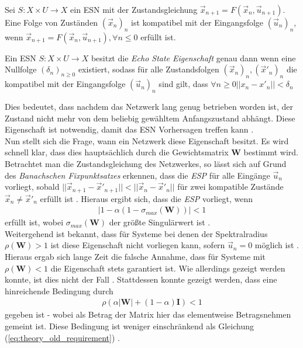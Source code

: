 \begin{definition}
Sei $S : X \times U \rightarrow X$ ein \textsc{ESN} mit der Zustandsgleichung $\vec{x}_{n+1} = F \left( \vec{x}_n, \vec{u}_{n+1} \right)$. Eine Folge von Zuständen $(\vec{x}_n)_n$ ist kompatibel mit der Eingangsfolge $(\vec{u}_n)_n$, wenn $\vec{x}_{n+1} = F\left( \vec{x}_n, \vec{u}_{n+1} \right), \forall n \leq 0$ erfüllt ist.
\end{definition}

\begin{definition}
Ein \textsc{ESN} $S : X \times U \rightarrow X$ besitzt die \textit{Echo State Eigenschaft} genau dann wenn eine Nullfolge $(\delta_n)_{n \geq 0}$ existiert, sodass für alle Zustandsfolgen $(\vec{x}_n)_n, (\vec{x}'_n)_n$ die kompatibel mit der Eingangsfolge $(\vec{u}_n)_n$ sind gilt, dass $\forall n \geq 0 ||x_n - x'_n|| < \delta_n$
\end{definition} 
Dies bedeutet, dass nachdem das Netzwerk lang genug betrieben worden ist, der Zustand nicht mehr von dem beliebig gewähltem Anfangszustand abhängt. Diese Eigenschaft ist notwendig, damit das \textsc{ESN} Vorhersagen treffen kann \cite{jeagerTut2002}.\\

Nun stellt sich die Frage, wann ein Netzwerk diese Eigenschaft besitzt. Es wird schnell klar, dass dies hauptsächlich durch die Gewichtsmatrix $\mathbf{W}$ bestimmt wird. Betrachtet man die Zustandsgleichung des Netzwerkes, so lässt sich auf Grund des \textit{Banachschen Fixpunktsatzes} erkennen, dass die \textit{ESP} für alle Eingänge $\vec{u}_n$ vorliegt, sobald $||\vec{x}_{n+1} - \vec{x}'_{n+1}|| < ||\vec{x}_n - \vec{x}'_n||$ für zwei kompatible Zustände $\vec{x}_n \neq \vec{x}'_n$ erfüllt ist \cite{jaeger2010}.
Hieraus ergibt sich, dass die \textit{ESP} vorliegt, wenn 
\begin{align}
\label{eq:theory_old_requirement}
|1-\alpha(1-\sigma_{max}(\mathbf{W}))| < 1
\end{align}
erfüllt ist, wobei $\sigma_{max}(\mathbf{W})$ der größte Singulärwert ist \cite{jaeger2007}.\\
Weitergehend ist bekannt, dass für Systeme bei denen der Spektralradius $\rho(\mathbf{W}) > 1$ ist diese Eigenschaft nicht vorliegen kann, sofern $\vec{u}_n = 0$ möglich ist \cite{jaeger2007, jaeger2010}.\\

Hieraus ergab sich lange Zeit die falsche Annahme, dass für Systeme mit $\rho(\mathbf{W}) < 1$ die Eigenschaft stets garantiert ist. Wie allerdings gezeigt werden konnte, ist dies nicht der Fall \citep{yildiz}. Stattdessen konnte gezeigt werden, dass eine hinreichende Bedingung durch
\begin{align}
\label{eq:theory_sufficient_requirement}
\rho(\alpha |\mathbf{W}|+(1-\alpha) \mathbf{I}) < 1
\end{align}
gegeben ist - wobei als Betrag der Matrix hier das elementweise Betragsnehmen gemeint ist. Diese Bedingung ist weniger einschränkend als Gleichung (\ref{eq:theory_old_requirement}) \cite{yildiz}.\\

